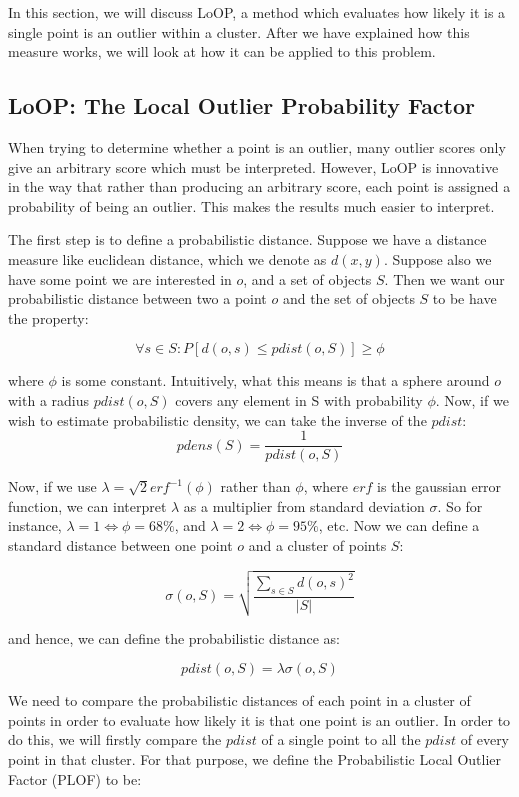\documentclass[12pt,a4paper,oneside]{report}
\begin{document}
In this section, we will discuss LoOP, a method which evaluates how likely it is a single point is an outlier within a cluster. After we have explained how this measure works, we will look at how it can be applied to this problem. 

\subsection{LoOP: The Local Outlier Probability Factor}

When trying to determine whether a point is an outlier, many outlier scores only give an arbitrary score which must be interpreted. However, LoOP is innovative in the way that rather than producing an arbitrary score, each point is assigned a probability of being an outlier. This makes the results much easier to interpret. 

The first step is to define a probabilistic distance. Suppose we have a distance measure like euclidean distance, which we denote as $d(x,y)$. Suppose also we have some point we are interested in $o$, and a set of objects $S$. Then we want our probabilistic distance between two a point $o$ and the set of objects $S$ to be have the property:

\[\forall s \in S: P[d(o,s) \leq pdist(o,S)] \geq \phi\]  

where $\phi$ is some constant. Intuitively, what this means is that a sphere around $o$ with a radius $pdist(o,S)$ covers any element in S with probability $\phi$. Now, if we wish to estimate probabilistic density, we can take the inverse of the $pdist$:
\[pdens(S) = \frac{1}{pdist(o,S)}\]

Now, if we use  $\lambda = \sqrt{2} erf^{-1}(\phi)$ rather than $\phi$, where $erf$ is the gaussian error function, we can interpret $\lambda$ as a multiplier from standard deviation $\sigma$. So for instance,  $\lambda = 1 \Leftrightarrow \phi = 68\%$, and $\lambda = 2 \Leftrightarrow \phi = 95\%$, etc. Now we can define a standard distance between one point $o$ and a cluster of points $S$:

\[\sigma (o,S) = \sqrt{\frac{\sum_{s \in S} d(o,s)^2}{|S|}}\]   

and hence, we can define the probabilistic distance as:

\[pdist(o,S) = \lambda \sigma(o,S)\]

We need to compare the probabilistic distances of each point in a cluster of points in order to evaluate how likely it is that one point is an outlier. In order to do this, we will firstly compare the $pdist$ of a single point to all the $pdist$ of every point in that cluster. For that purpose, we define the Probabilistic Local Outlier Factor (PLOF) to be:
\end{document}

